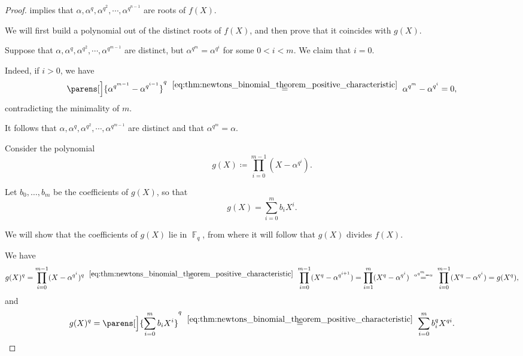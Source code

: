 \begin{proof}
   implies that \( \alpha, \alpha^q, \alpha^{q^2}, \cdots, \alpha^{q^{n-1}} \) are roots of \( f(X) \).

  We will first build a polynomial out of the distinct roots of \( f(X) \), and then prove that it coincides with \( g(X) \).

  Suppose that \( \alpha, \alpha^q, \alpha^{q^2}, \cdots, \alpha^{q^{m-1}} \) are distinct, but \( \alpha^{q^m} = \alpha^{q^i} \) for some \( 0 < i < m \). We claim that \( i = 0 \).

  Indeed, if \( i > 0 \), we have
  \begin{equation*}
    \parens[\Big]{ \alpha^{q^{m-1}} - \alpha^{q^{i-1}} }^q
    \reloset {\eqref{eq:thm:newtons_binomial_theorem_positive_characteristic}} =
    \alpha^{q^m} - \alpha^{q^i}
    =
    0,
  \end{equation*}
  contradicting the minimality of \( m \).

  It follows that \( \alpha, \alpha^q, \alpha^{q^2}, \cdots, \alpha^{q^{m-1}} \) are distinct and that \( \alpha^{q^m} = \alpha \).

  Consider the polynomial
  \begin{equation*}
    g(X) \coloneqq \prod_{i=0}^{m-1} (X - \alpha^{q^i}).
  \end{equation*}

  Let \( b_0, \ldots, b_m \) be the coefficients of \( g(X) \), so that
  \begin{equation*}
    g(X) = \sum_{i=0}^m b_i X^i.
  \end{equation*}

  We will show that the coefficients of \( g(X) \) lie in \( \BbbF_q \), from where it will follow that \( g(X) \) divides \( f(X) \).

  We have
  \begin{align*}
    g(X)^q
    =
    \prod_{i=0}^{m-1} (X - \alpha^{q^i})^q
    \reloset {\eqref{eq:thm:newtons_binomial_theorem_positive_characteristic}} =
    \prod_{i=0}^{m-1} (X^q - \alpha^{q^{i + 1}})
    =
    \prod_{i=1}^m (X^q - \alpha^{q^i})
    \reloset {\alpha^{q^m} = \alpha} =
    \prod_{i=0}^{m-1} (X^q - \alpha^{q^i})
    =
    g(X^q),
  \end{align*}
  and
  \begin{equation*}
    g(X)^q
    =
    \parens[\Big]{ \sum_{i=0}^m b_i X^i }^q
    \reloset {\eqref{eq:thm:newtons_binomial_theorem_positive_characteristic}} =
    \sum_{i=0}^m b_i^q X^{qi}.
  \end{equation*}


\end{proof}
